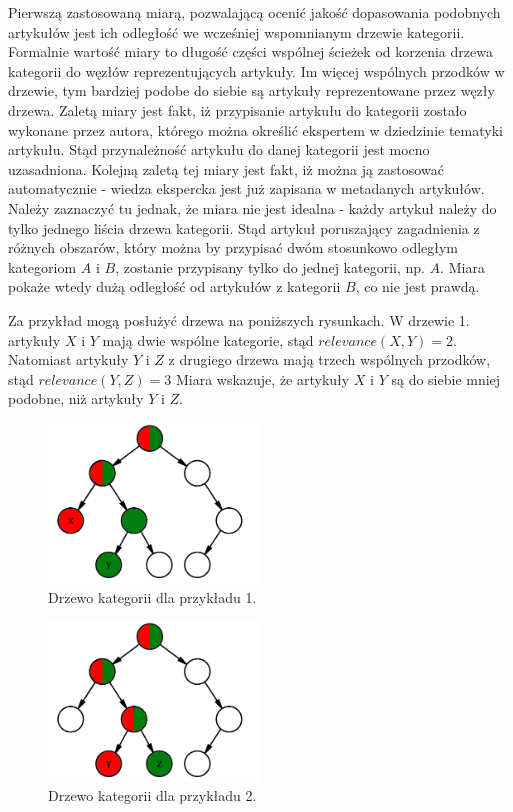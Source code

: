 \documentclass[pl]{minipw} %
\begin{document}
Pierwszą zastosowaną miarą, pozwalającą ocenić jakość dopasowania podobnych artykułów jest ich odległość we wcześniej wspomnianym drzewie kategorii. Formalnie wartość miary to długość części wspólnej ścieżek od korzenia drzewa kategorii do węzłów reprezentujących artykuły. Im więcej wspólnych przodków w drzewie, tym bardziej podobe do siebie są artykuły reprezentowane przez węzły drzewa. Zaletą miary jest fakt, iż przypisanie artykułu do kategorii zostało wykonane przez autora, którego można określić ekspertem w dziedzinie tematyki artykułu. Stąd przynależność artykułu do danej kategorii jest mocno uzasadniona. Kolejną zaletą tej miary jest fakt, iż można ją zastosować automatycznie - wiedza ekspercka jest już zapisana w metadanych artykułów. Należy zaznaczyć tu jednak, że miara nie jest idealna - każdy artykuł należy do tylko jednego liścia drzewa kategorii. Stąd artykuł poruszający zagadnienia z różnych obszarów, który można by przypisać dwóm stosunkowo odległym kategoriom $A$ i $B$, zostanie przypisany tylko do jednej kategorii, np. $A$. Miara pokaże wtedy dużą odległość od artykułów z kategorii $B$, co nie jest prawdą.

Za przykład mogą posłużyć drzewa na poniższych rysunkach. W drzewie 1. artykuły $X$ i $Y$ mają dwie wspólne kategorie, stąd $relevance(X, Y) = 2$. Natomiast artykuły $Y$ i $Z$ z drugiego drzewa mają trzech wspólnych przodków, stąd $relevance(Y, Z)=3$ Miara wskazuje, że artykuły $X$ i $Y$ są do siebie mniej podobne, niż artykuły $Y$ i $Z$.

\begin{figure}[H]
	\centering
	\includegraphics[width=0.5\textwidth]{img/cat_tree_example_1.png}
	\caption{Drzewo kategorii dla przykładu 1.}
\end{figure}
\begin{figure}[H]
	\centering
	\includegraphics[width=0.5\textwidth]{img/cat_tree_example_2.png}
	\caption{Drzewo kategorii dla przykładu 2.}
	\label{fig:warstwy}
\end{figure}
\end{document}
